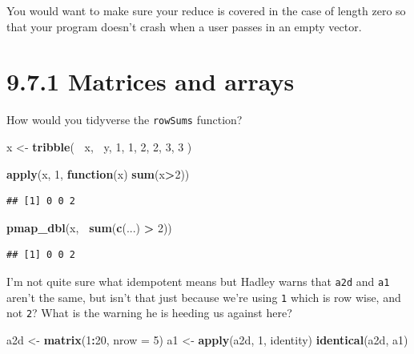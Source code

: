 \documentclass[]{book}
\newenvironment{Shaded}{\begin{snugshade}}{\end{snugshade}}
\newcommand{\ControlFlowTok}[1]{\textcolor[rgb]{0.13,0.29,0.53}{\textbf{#1}}}
\newcommand{\DataTypeTok}[1]{\textcolor[rgb]{0.13,0.29,0.53}{#1}}
\newcommand{\DecValTok}[1]{\textcolor[rgb]{0.00,0.00,0.81}{#1}}
\newcommand{\KeywordTok}[1]{\textcolor[rgb]{0.13,0.29,0.53}{\textbf{#1}}}
\newcommand{\NormalTok}[1]{#1}
\newcommand{\OperatorTok}[1]{\textcolor[rgb]{0.81,0.36,0.00}{\textbf{#1}}}
\newcommand{\StringTok}[1]{\textcolor[rgb]{0.31,0.60,0.02}{#1}}
\begin{document}
You would want to make sure your reduce is covered in the case of length zero so that your program doesn't crash when a user passes in an empty vector.

\hypertarget{matrices-and-arrays}{%
\section*{9.7.1 Matrices and arrays}\label{matrices-and-arrays}}

How would you tidyverse the \texttt{rowSums} function?

\begin{Shaded}
\begin{Highlighting}[]
\NormalTok{x <-}\StringTok{ }\KeywordTok{tribble}\NormalTok{(}
  \OperatorTok{~}\NormalTok{x, }\OperatorTok{~}\NormalTok{y,}
  \DecValTok{1}\NormalTok{, }\DecValTok{1}\NormalTok{,}
  \DecValTok{2}\NormalTok{, }\DecValTok{2}\NormalTok{,}
  \DecValTok{3}\NormalTok{, }\DecValTok{3}
\NormalTok{)}

\KeywordTok{apply}\NormalTok{(x, }\DecValTok{1}\NormalTok{, }\ControlFlowTok{function}\NormalTok{(x) }\KeywordTok{sum}\NormalTok{(x}\OperatorTok{>}\DecValTok{2}\NormalTok{))}
\end{Highlighting}
\end{Shaded}

\begin{verbatim}
## [1] 0 0 2
\end{verbatim}

\begin{Shaded}
\begin{Highlighting}[]
\KeywordTok{pmap_dbl}\NormalTok{(x, }\OperatorTok{~}\KeywordTok{sum}\NormalTok{(}\KeywordTok{c}\NormalTok{(...) }\OperatorTok{>}\StringTok{ }\DecValTok{2}\NormalTok{))}
\end{Highlighting}
\end{Shaded}

\begin{verbatim}
## [1] 0 0 2
\end{verbatim}

I'm not quite sure what idempotent means but Hadley warns that \texttt{a2d} and \texttt{a1} aren't the same, but isn't that just because we're using \texttt{1} which is row wise, and not \texttt{2}? What is the warning he is heeding us against here?

\begin{Shaded}
\begin{Highlighting}[]
\NormalTok{a2d <-}\StringTok{ }\KeywordTok{matrix}\NormalTok{(}\DecValTok{1}\OperatorTok{:}\DecValTok{20}\NormalTok{, }\DataTypeTok{nrow =} \DecValTok{5}\NormalTok{)}
\NormalTok{a1 <-}\StringTok{ }\KeywordTok{apply}\NormalTok{(a2d, }\DecValTok{1}\NormalTok{, identity)}
\KeywordTok{identical}\NormalTok{(a2d, a1)}
\end{Highlighting}
\end{Shaded}
\end{document}
